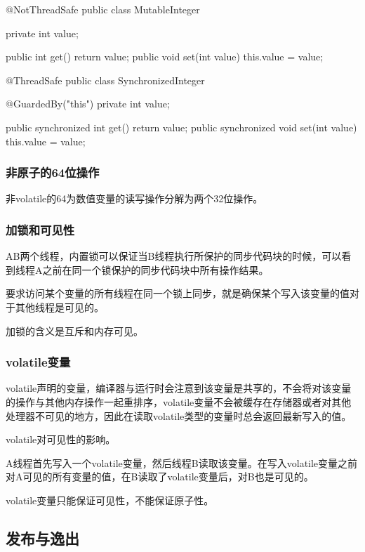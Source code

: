 \begin{Java}
@NotThreadSafe
public class MutableInteger {
	private int value;
	
	public int get() {return value;}
	public void set(int value) { this.value = value;}
} 
\end{Java}


\begin{Java}[get和set必须同时设定为同步才能保证可见性]
@ThreadSafe
public class SynchronizedInteger {
	@GuardedBy("this") private int value;
	
	public synchronized int get() {return value;}
	public synchronized void set(int value) { this.value = value;}
}
\end{Java}


\subsubsection{非原子的64位操作}

非volatile的64为数值变量的读写操作分解为两个32位操作。

\subsubsection{加锁和可见性}

AB两个线程，内置锁可以保证当B线程执行所保护的同步代码块的时候，可以看到线程A之前在同一个锁保护的同步代码块中所有操作结果。

要求访问某个变量的所有线程在同一个锁上同步，就是确保某个写入该变量的值对于其他线程是可见的。

加锁的含义是互斥和内存可见。

\subsubsection{volatile变量}

volatile声明的变量，编译器与运行时会注意到该变量是共享的，不会将对该变量的操作与其他内存操作一起重排序，volatile变量不会被缓存在存储器或者对其他处理器不可见的地方，因此在读取volatile类型的变量时总会返回最新写入的值。


volatile对可见性的影响。

A线程首先写入一个volatile变量，然后线程B读取该变量。在写入volatile变量之前对A可见的所有变量的值，在B读取了volatile变量后，对B也是可见的。


volatile变量只能保证可见性，不能保证原子性。


\subsection{发布与逸出}

